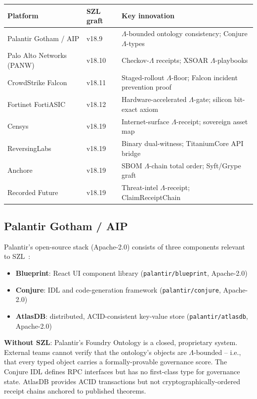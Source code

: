 \begin{center}
\begin{tabular}{lll}
\textbf{Platform} & \textbf{SZL graft} & \textbf{Key innovation} \\
\hline
Palantir Gotham / AIP & v18.9 & \(\Lambda\)-bounded ontology consistency; Conjure \(\Lambda\)-types \\
Palo Alto Networks (PANW) & v18.10 & Checkov-\(\Lambda\) receipts; XSOAR \(\Lambda\)-playbooks \\
CrowdStrike Falcon & v18.11 & Staged-rollout \(\Lambda\)-floor; Falcon incident prevention proof \\
Fortinet FortiASIC & v18.12 & Hardware-accelerated \(\Lambda\)-gate; silicon bit-exact axiom \\
Censys & v18.19 & Internet-surface \(\Lambda\)-receipt; sovereign asset map \\
ReversingLabs & v18.19 & Binary dual-witness; TitaniumCore API bridge \\
Anchore & v18.19 & SBOM \(\Lambda\)-chain total order; Syft/Grype graft \\
Recorded Future & v18.19 & Threat-intel \(\Lambda\)-receipt; ClaimReceiptChain \\
\end{tabular}
\end{center}

\subsection{Palantir Gotham / AIP}
\label{ssec:palantir}

Palantir's open-source stack (Apache-2.0) consists of three components
relevant to SZL~\cite{szl_palantir_graft}:

\begin{itemize}
  \item \textbf{Blueprint}: React UI component library
    (\texttt{palantir/blueprint}, Apache-2.0)
  \item \textbf{Conjure}: IDL and code-generation framework
    (\texttt{palantir/conjure}, Apache-2.0)
  \item \textbf{AtlasDB}: distributed, ACID-consistent key-value store
    (\texttt{palantir/atlasdb}, Apache-2.0)
\end{itemize}

\textbf{Without SZL}: Palantir's Foundry Ontology is a closed,
proprietary system.  External teams cannot verify that the ontology's
objects are $\Lambda$-bounded -- i.e., that every typed object carries
a formally-provable governance score.  The Conjure IDL defines RPC
interfaces but has no first-class type for governance state.  AtlasDB
provides ACID transactions but not cryptographically-ordered receipt
chains anchored to published theorems.


